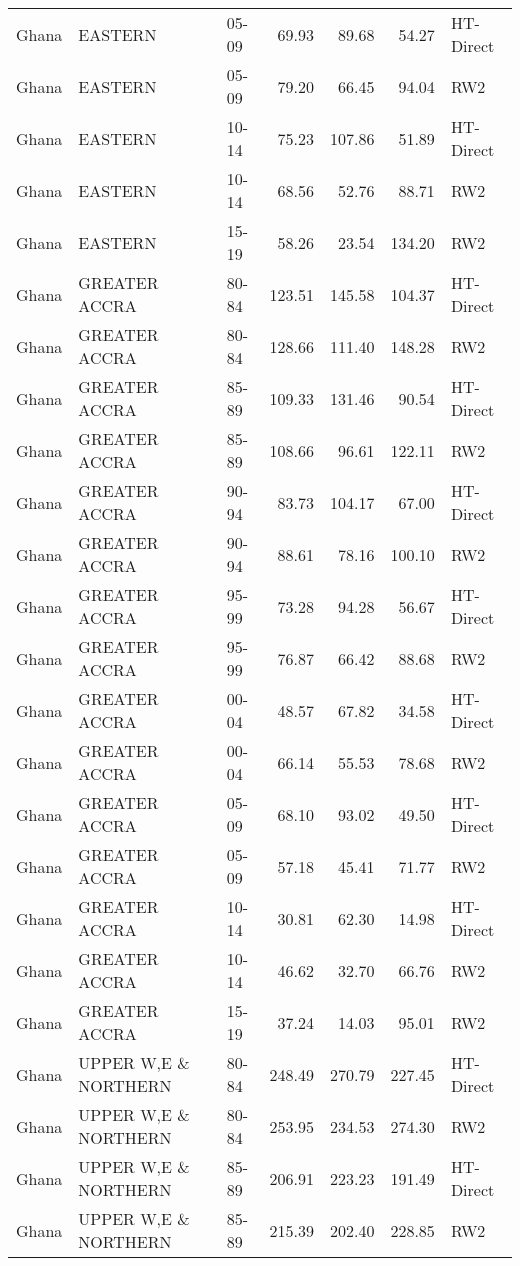 \begin{longtable}{lllrrrl}
  Ghana & EASTERN & 05-09 & 69.93 & 89.68 & 54.27 & HT-Direct \\ 
  Ghana & EASTERN & 05-09 & 79.20 & 66.45 & 94.04 & RW2 \\ 
  Ghana & EASTERN & 10-14 & 75.23 & 107.86 & 51.89 & HT-Direct \\ 
  Ghana & EASTERN & 10-14 & 68.56 & 52.76 & 88.71 & RW2 \\ 
  Ghana & EASTERN & 15-19 & 58.26 & 23.54 & 134.20 & RW2 \\ 
  Ghana & GREATER ACCRA & 80-84 & 123.51 & 145.58 & 104.37 & HT-Direct \\ 
  Ghana & GREATER ACCRA & 80-84 & 128.66 & 111.40 & 148.28 & RW2 \\ 
  Ghana & GREATER ACCRA & 85-89 & 109.33 & 131.46 & 90.54 & HT-Direct \\ 
  Ghana & GREATER ACCRA & 85-89 & 108.66 & 96.61 & 122.11 & RW2 \\ 
  Ghana & GREATER ACCRA & 90-94 & 83.73 & 104.17 & 67.00 & HT-Direct \\ 
  Ghana & GREATER ACCRA & 90-94 & 88.61 & 78.16 & 100.10 & RW2 \\ 
  Ghana & GREATER ACCRA & 95-99 & 73.28 & 94.28 & 56.67 & HT-Direct \\ 
  Ghana & GREATER ACCRA & 95-99 & 76.87 & 66.42 & 88.68 & RW2 \\ 
  Ghana & GREATER ACCRA & 00-04 & 48.57 & 67.82 & 34.58 & HT-Direct \\ 
  Ghana & GREATER ACCRA & 00-04 & 66.14 & 55.53 & 78.68 & RW2 \\ 
  Ghana & GREATER ACCRA & 05-09 & 68.10 & 93.02 & 49.50 & HT-Direct \\ 
  Ghana & GREATER ACCRA & 05-09 & 57.18 & 45.41 & 71.77 & RW2 \\ 
  Ghana & GREATER ACCRA & 10-14 & 30.81 & 62.30 & 14.98 & HT-Direct \\ 
  Ghana & GREATER ACCRA & 10-14 & 46.62 & 32.70 & 66.76 & RW2 \\ 
  Ghana & GREATER ACCRA & 15-19 & 37.24 & 14.03 & 95.01 & RW2 \\ 
  Ghana & UPPER W,E \& NORTHERN & 80-84 & 248.49 & 270.79 & 227.45 & HT-Direct \\ 
  Ghana & UPPER W,E \& NORTHERN & 80-84 & 253.95 & 234.53 & 274.30 & RW2 \\ 
  Ghana & UPPER W,E \& NORTHERN & 85-89 & 206.91 & 223.23 & 191.49 & HT-Direct \\ 
  Ghana & UPPER W,E \& NORTHERN & 85-89 & 215.39 & 202.40 & 228.85 & RW2 \\ 

\end{longtable}
